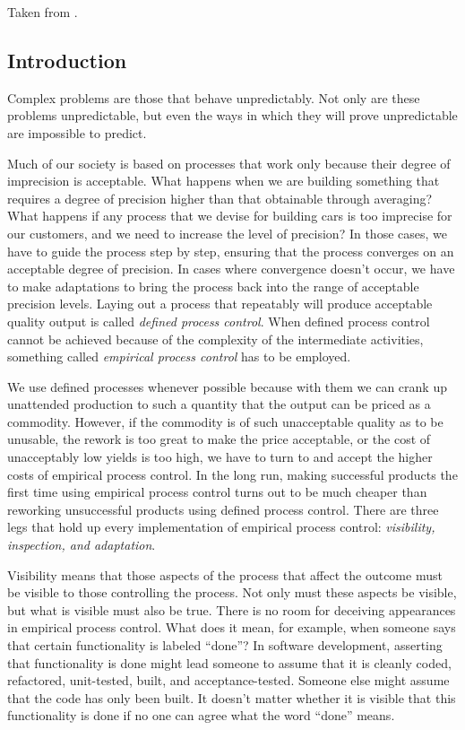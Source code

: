 
Taken from \cite{schwaber2004agile}.

\subsection{Introduction}

Complex problems are those that behave unpredictably. Not only are these problems unpredictable, but even the ways in which they will prove unpredictable are impossible to predict.

Much of our society is based on processes that work only because their degree of imprecision is acceptable. What happens when we are building something that requires a degree of precision higher than that obtainable through averaging? What happens if any process that we devise for building cars is too imprecise for our customers, and we need to increase the level of precision? In those cases, we have to guide the process step by step, ensuring that the process converges on an acceptable degree of precision. In cases where convergence doesn’t occur, we have to make adaptations to bring the process back into the range of acceptable precision levels. Laying out a process that repeatably will produce acceptable quality output is called \emph{defined process control}. When defined process control cannot be achieved because of the complexity of the intermediate activities, something called \emph{empirical process control} has to be employed.

We use defined processes whenever possible because with them we can crank up unattended production to such a quantity that the output can be priced as a commodity. However, if the commodity is of such unacceptable quality as to be unusable, the rework is too great to make the price acceptable, or the cost of unacceptably low yields is too high, we have to turn to and accept the higher costs of empirical process control. In the long run, making successful products the first time using empirical process control turns out to be much cheaper than reworking unsuccessful products using defined process control. There are three legs that hold up every implementation of empirical process control: \emph{visibility, inspection, and adaptation}.

Visibility means that those aspects of the process that affect the outcome must be visible to those controlling the process. Not only must these aspects be visible, but what is visible must also be true. There is no room for deceiving appearances in empirical process control. What does it mean, for example, when someone says that certain functionality is labeled “done”? In software development, asserting that functionality is done might lead someone to assume that it is cleanly coded, refactored, unit-tested, built, and acceptance-tested. Someone else might assume that the code has only been built. It doesn’t matter whether it is visible that this functionality is done if no one can agree what the word “done” means.

